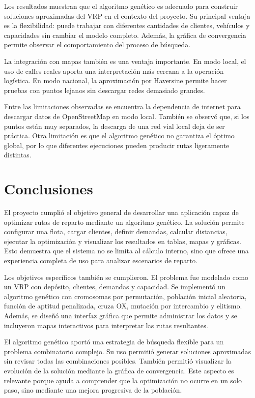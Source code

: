 \documentclass[runningheads]{llncs}
\begin{document}
Los resultados muestran que el algoritmo gen\'etico es adecuado para construir
soluciones aproximadas del VRP en el contexto del proyecto. Su principal ventaja
es la flexibilidad: puede trabajar con diferentes cantidades de clientes,
veh\'iculos y capacidades sin cambiar el modelo completo. Adem\'as, la gr\'afica de
convergencia permite observar el comportamiento del proceso de b\'usqueda.

La integraci\'on con mapas tambi\'en es una ventaja importante. En modo local, el
uso de calles reales aporta una interpretaci\'on m\'as cercana a la operaci\'on
log\'istica. En modo nacional, la aproximaci\'on por Haversine permite hacer
pruebas con puntos lejanos sin descargar redes demasiado grandes.

Entre las limitaciones observadas se encuentra la dependencia de internet para
descargar datos de OpenStreetMap en modo local. Tambi\'en se observ\'o que, si los
puntos est\'an muy separados, la descarga de una red vial local deja de ser
pr\'actica. Otra limitaci\'on es que el algoritmo gen\'etico no garantiza el \'optimo
global, por lo que diferentes ejecuciones pueden producir rutas ligeramente
distintas.

\section{Conclusiones}

El proyecto cumpli\'o el objetivo general de desarrollar una aplicaci\'on capaz de
optimizar rutas de reparto mediante un algoritmo gen\'etico. La soluci\'on permite
configurar una flota, cargar clientes, definir demandas, calcular distancias,
ejecutar la optimizaci\'on y visualizar los resultados en tablas, mapas y
gr\'aficas. Esto demuestra que el sistema no se limita al c\'alculo interno, sino
que ofrece una experiencia completa de uso para analizar escenarios de reparto.

Los objetivos espec\'ificos tambi\'en se cumplieron. El problema fue modelado como
un VRP con dep\'osito, clientes, demandas y capacidad. Se implement\'o un algoritmo
gen\'etico con cromosomas por permutaci\'on, poblaci\'on inicial aleatoria, funci\'on
de aptitud penalizada, cruza OX, mutaci\'on por intercambio y elitismo. Adem\'as,
se dise\~n\'o una interfaz gr\'afica que permite administrar los datos y se
incluyeron mapas interactivos para interpretar las rutas resultantes.

El algoritmo gen\'etico aport\'o una estrategia de b\'usqueda flexible para un
problema combinatorio complejo. Su uso permiti\'o generar soluciones aproximadas
sin revisar todas las combinaciones posibles. Tambi\'en permiti\'o visualizar la
evoluci\'on de la soluci\'on mediante la gr\'afica de convergencia. Este aspecto es
relevante porque ayuda a comprender que la optimizaci\'on no ocurre en un solo
paso, sino mediante una mejora progresiva de la poblaci\'on.
\end{document}
